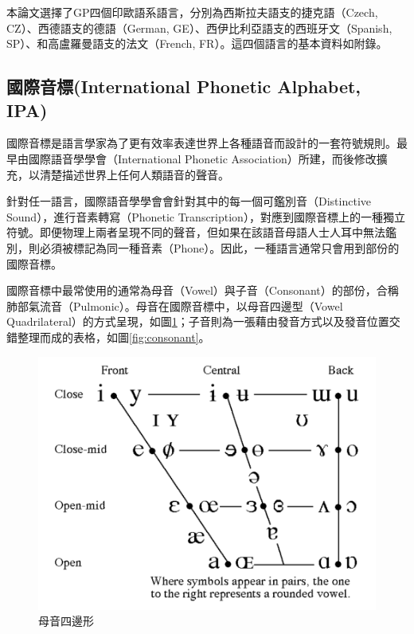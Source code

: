 本論文選擇了GP四個印歐語系語言，分別為西斯拉夫語支的捷克語（Czech, CZ）、西德語支的德語（German, GE）、西伊比利亞語支的西班牙文（Spanish, SP）、和高盧羅曼語支的法文（French, FR）。這四個語言的基本資料如附錄。
\subsection{國際音標(International Phonetic Alphabet, IPA)}
國際音標是語言學家為了更有效率表達世界上各種語音而設計的一套符號規則。最早由國際語音學學會（International Phonetic Association）所建，而後修改擴充，以清楚描述世界上任何人類語音的聲音。

針對任一語言，國際語音學學會會針對其中的每一個可鑑別音（Distinctive Sound），進行音素轉寫（Phonetic Transcription），對應到國際音標上的一種獨立符號。即便物理上兩者呈現不同的聲音，但如果在該語音母語人士人耳中無法鑑別，則必須被標記為同一種音素（Phone）。因此，一種語言通常只會用到部份的國際音標。

國際音標中最常使用的通常為母音（Vowel）與子音（Consonant）的部份，合稱肺部氣流音（Pulmonic）。母音在國際音標中，以母音四邊型（Vowel Quadrilateral）的方式呈現，如圖\ref{fig:vowel}；子音則為一張藉由發音方式以及發音位置交錯整理而成的表格，如圖\ref{fig:consonant}。

\begin{figure}
\centering
\includegraphics[scale=0.4]{images/chap2_vowel_quadrilateral.png}
\caption{母音四邊形}
\label{fig:vowel}
\end{figure}


